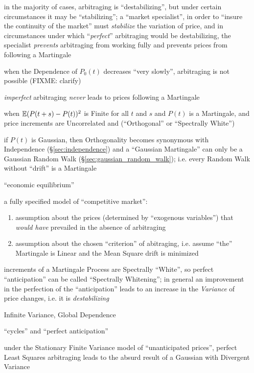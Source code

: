 in the majority of cases, arbitraging is ``destabilizing'', but under certain
circumstances it may be ``stabilizing''; a ``market specialist'', in order to
``insure the continuity of the market'' must \emph{stabilize} the variation of
price, and in circumstances under which ``\emph{perfect}'' arbitraging would be
destabilizing, the specialist \emph{prevents} arbitraging from working fully and
prevents prices from following a Martingale

when the Dependence of $P_0(t)$ decreases ``very slowly'', arbitraging is not
possible (FIXME: clarify)

\emph{imperfect} arbitraging \emph{never} leads to prices following a Martingale

when $\mathbb{E}(P(t + s) - P(t))^2$ is Finite for all $t$ and $s$ and $P(t)$ is a
Martingale, and price increments are Uncorrelated and (``Orthogonal'' or
``Spectrally White'')

if $P(t)$ is Gaussian, then Orthogonality becomes synonymous with Independence
(\S\ref{sec:independence}) and a ``Gaussian Martingale'' can only be a Gaussian
Random Walk (\S\ref{sec:gaussian_random_walk}); i.e. every Random Walk without
``drift'' is a Martingale

``economic equilibrium''

a fully specified model of ``competitive market'':
\begin{enumerate}
  \item assumption about the prices (determined by ``exogenous variables'') that
    \emph{would have} prevailed in the absence of arbitraging
  \item assumption about the chosen ``criterion'' of abitraging, i.e. assume
    ``the'' Martingale is Linear and the Mean Square drift is minimized
\end{enumerate}

increments of a Martingale Process are Spectrally ``White'', so perfect
``anticipation'' can be called ``Spectrally Whitening''; in general an
improvement in the perfection of the ``anticipation'' leads to an increase in
the \emph{Variance} of price changes, i.e. it is \emph{destabilizing}

Infinite Variance, Global Dependence

``cycles'' and ``perfect anticipation''

under the Stationary Finite Variance model of ``unanticipated prices'', perfect
Least Squares arbitraging leads to the absurd result of a Gaussian with
Divergent Variance

